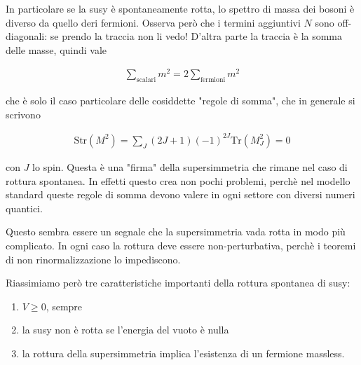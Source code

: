 \documentclass{report}
\begin{document}
In particolare se la susy è spontaneamente rotta, lo spettro di massa dei bosoni è diverso da quello deri fermioni. Osserva però che i termini aggiuntivi \(N\) sono off-diagonali: se prendo la traccia non li vedo! D'altra parte la traccia è la somma delle masse, quindi vale 

\begin{align}
    \sum_{\text{scalari}}m^2 = 2\sum_{\text{fermioni}}m^2
\end{align}

che è solo il caso particolare delle cosiddette "regole di somma", che in generale si scrivono 

\begin{align}
    \text{Str}(M^2) = \sum_J (2J+1)(-1)^{2J}\text{Tr}(M_J^2) = 0 
\end{align}

con \(J\) lo spin. Questa è una "firma" della supersimmetria che rimane nel caso di rottura spontanea. In effetti questo crea non pochi problemi, perchè nel modello standard queste regole di somma devono valere in ogni settore con diversi numeri quantici. 


Questo sembra essere un segnale che la supersimmetria vada rotta in modo più complicato. In ogni caso la rottura deve essere non-perturbativa, perchè i teoremi di non rinormalizzazione lo impediscono. 

Riassimiamo però tre caratteristiche importanti della rottura spontanea di susy: 

\begin{enumerate}
    \item \(V \geq 0\), sempre
    \item la susy non è rotta se l'energia del vuoto è nulla 
    \item la rottura della supersimmetria implica l'esistenza di un fermione massless. 
\end{enumerate}
\end{document}
